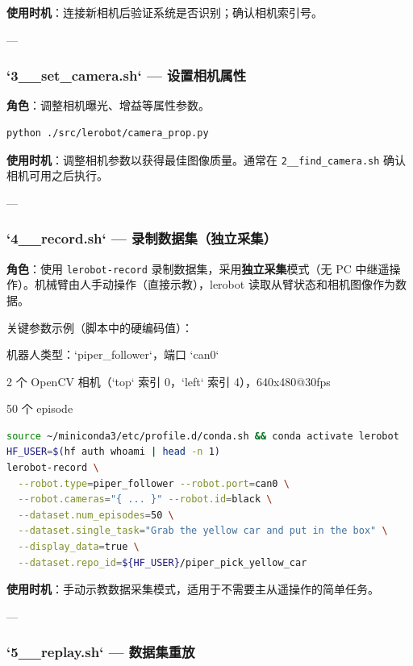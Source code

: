 \documentclass[UTF8,a4paper,11pt]{ctexart}
\begin{document}
{\textbf{使用时机}：连接新相机后验证系统是否识别；确认相机索引号。

---

\subsubsection{`3__set_camera.sh` — 设置相机属性}

\textbf{角色}：调整相机曝光、增益等属性参数。

\begin{lstlisting}[language=bash]
python ./src/lerobot/camera_prop.py
\end{lstlisting}

\textbf{使用时机}：调整相机参数以获得最佳图像质量。通常在 \texttt{2__find_camera.sh} 确认相机可用之后执行。

---

\subsubsection{`4__record.sh` — 录制数据集（独立采集）}

\textbf{角色}：使用 \texttt{lerobot-record} 录制数据集，采用\textbf{独立采集}模式（无 PC 中继遥操作）。机械臂由人手动操作（直接示教），lerobot 读取从臂状态和相机图像作为数据。

关键参数示例（脚本中的硬编码值）：
\item 机器人类型：`piper_follower`，端口 `can0`
\item 2 个 OpenCV 相机（`top` 索引 0，`left` 索引 4），640x480@30fps
\item 50 个 episode

\begin{lstlisting}[language=bash]
source ~/miniconda3/etc/profile.d/conda.sh && conda activate lerobot
HF_USER=$(hf auth whoami | head -n 1)
lerobot-record \
  --robot.type=piper_follower --robot.port=can0 \
  --robot.cameras="{ ... }" --robot.id=black \
  --dataset.num_episodes=50 \
  --dataset.single_task="Grab the yellow car and put in the box" \
  --display_data=true \
  --dataset.repo_id=${HF_USER}/piper_pick_yellow_car
\end{lstlisting}

\textbf{使用时机}：手动示教数据采集模式，适用于不需要主从遥操作的简单任务。

---

\subsubsection{`5__replay.sh` — 数据集重放}

}
\end{document}
